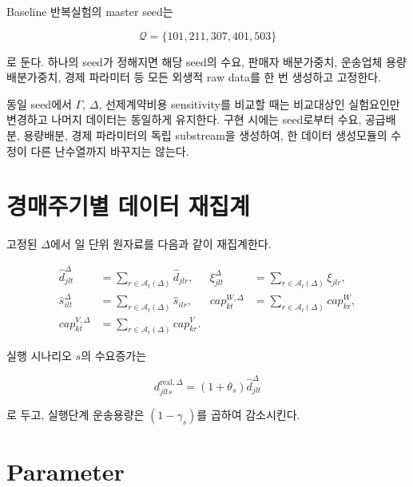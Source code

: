 \documentclass[11pt,a4paper]{article}
\newcommand{\Aset}{\mathcal A}
\begin{document}
Baseline 반복실험의 master seed는

\[
\mathcal Q=\{101,211,307,401,503\}
\]

로 둔다.
하나의 seed가 정해지면 해당 seed의
수요, 판매자 배분가중치, 운송업체 용량배분가중치, 경제 파라미터 등
모든 외생적 raw data를 한 번 생성하고 고정한다.

동일 seed에서 $\Gamma$, $\Delta$, 선제계약비용 sensitivity를 비교할 때는
비교대상인 실험요인만 변경하고 나머지 데이터는 동일하게 유지한다.
구현 시에는 seed로부터 수요, 공급배분, 용량배분, 경제 파라미터의 독립 substream을 생성하여,
한 데이터 생성모듈의 수정이 다른 난수열까지 바꾸지는 않는다.

\section{경매주기별 데이터 재집계}

고정된 $\Delta$에서 일 단위 원자료를 다음과 같이 재집계한다.

\begin{align}
\hat d^\Delta_{jlt}
&=\sum_{r\in\Aset_t(\Delta)}\hat d_{jlr},&
\xi^\Delta_{jlt}
&=\sum_{r\in\Aset_t(\Delta)}\xi_{jlr},\\
\hat s^\Delta_{ilt}
&=\sum_{r\in\Aset_t(\Delta)}\hat s_{ilr},&
cap^{W,\Delta}_{kt}
&=\sum_{r\in\Aset_t(\Delta)}cap^W_{kr},\\
cap^{V,\Delta}_{kt}
&=\sum_{r\in\Aset_t(\Delta)}cap^V_{kr}.&&
\end{align}

실행 시나리오 $s$의 수요증가는

\[
d^{\mathrm{real},\Delta}_{jlts}
=
(1+\theta_s)\hat d^\Delta_{jlt}
\]

로 두고, 실행단계 운송용량은 $(1-\gamma_s)$를 곱하여 감소시킨다.

\section{Parameter}
\end{document}
